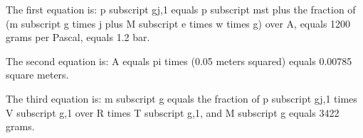 The first equation is:
p subscript gj,1 equals p subscript mst plus the fraction of (m subscript g times j plus M subscript e times w times g) over A, equals 1200 grams per Pascal, equals 1.2 bar.

The second equation is:
A equals pi times (0.05 meters squared) equals 0.00785 square meters.

The third equation is:
m subscript g equals the fraction of p subscript gj,1 times V subscript g,1 over R times T subscript g,1, and M subscript g equals 3422 grams.